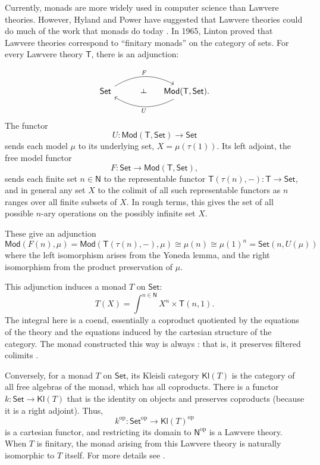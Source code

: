 \documentclass{amsart}
\newcommand{\define}[1]{{\bf \boldmath{#1}}}
\theoremstyle{definition}
\def\ld{\rotatebox[origin=c]{-90}{$\dashv$}} %
\newcommand{\Set}{\mathsf{Set}}
\newcommand{\Mod}{\mathsf{Mod}}
\newcommand{\NN}{\mathsf{N}}
\newcommand{\T}{\mathsf{T}}
\newcommand{\Kl}{\mathsf{Kl}}
\newcommand{\op}{\mathrm{op}}
\newcommand{\maps}{\colon}
\begin{document}
Currently, monads are more widely used in computer science than Lawvere theories.  However, Hyland and Power have suggested that Lawvere theories could do much of the work that monads do today \cite{hylandpower}. In 1965, Linton \cite{linton} proved that Lawvere theories correspond to ``finitary monads'' on the category of sets.   For every Lawvere theory $\T$, there is an adjunction:
\iffalse
\[
\xymatrix{
\Set \ar@<1.1ex>[r]^-F_-\bot &
\Mod(\T,\Set) \ar@<1.1ex>[l]^-U
}\]
\fi
\[\begin{tikzcd}[column sep=small]
\Set \arrow[bend left,below]{rr}{F}
& {\phantom{AA} \ld} &
\arrow[bend left,above]{ll}{U} \Mod(\T,\Set).
\end{tikzcd}\]
The functor 
\[  U \maps \Mod(\T,\Set) \to \Set \]
sends each model $\mu$ to its underlying set, $X = \mu(\tau(1))$. 
Its left adjoint, the free model functor 
\[       F \maps\Set \to \Mod(\T,\Set), \]
sends each finite set $n \in \NN$ to the representable functor $\T(\tau(n),-)\maps \T \to \Set$, and in general any set $X$ to the colimit of all such representable functors as $n$ ranges over all finite subsets of $X$.   In rough terms, this gives the set of all possible $n$-ary operations on the possibly infinite set $X$.

These give an adjunction
\[   \Mod(F(n),\mu) = \Mod(\T(\tau(n),-),\mu) \cong \mu(n) \cong \mu(1)^n = \Set(n,U(\mu))\] 
where the left isomorphism arises from the Yoneda lemma, and the right isomorphism from the product preservation of $\mu$. 

This adjunction induces a monad $T$ on $\Set$:
\begin{equation}
T(X) = \int^{n\in \NN} X^n \times \T(n,1).
\end{equation}
The integral here is a coend, essentially a coproduct quotiented by the equations of the theory and the equations induced by the cartesian structure of the category.    The monad constructed this way is always \define{finitary}: that is, it preserves filtered colimits \cite{adamekrosicky}.

Conversely, for a monad $T$ on $\Set$, its Kleisli category $\Kl(T)$ is the category of all free algebras of the monad, which has all coproducts. There is a functor $k\maps \Set \to \Kl(T)$ that is the identity on objects and preserves coproducts (because it is a right adjoint).  Thus,
\[ k^{\op}\maps \Set^{\op} \to \Kl(T)^{\op} \]
is a cartesian functor, and restricting its domain to $\NN^{\op}$ is a Lawvere theory. 
When $T$ is finitary, the monad arising from this Lawvere theory is naturally isomorphic to $T$ itself.  For more details see \cite{barrwells,lawvere,milewski}.
\end{document}
